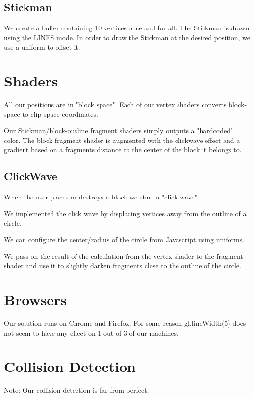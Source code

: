 \documentclass[12pt,leqno]{article}
\begin{document}
\subsection{Stickman}
We create a buffer containing 10 vertices once and for all.
The Stickman is drawn using the LINES mode.
In order to draw the Stickman at the desired position, we use a uniform to offset it.

\section{Shaders}
All our positions are in "block space". Each of our vertex shaders converts block-space to clip-space coordinates.

Our Stickman/block-outline fragment shaders simply outputs a "hardcoded" color. The block fragment shader is augmented with the clickwave effect and a gradient based on a fragments distance to the center of the block it belongs to.

\subsection{ClickWave}
When the user places or destroys a block we start a "click wave". 

We implemented the click wave by displacing vertices away from the outline of a circle.

We can configure the center/radius of the circle from Javascript using uniforms.

We pass on the result of the calculation from the vertex shader to the fragment shader and use it to slightly darken fragments close to the outline of the circle.

\section{Browsers}

Our solution runs on Chrome and Firefox. For some reason gl.lineWidth(5) does not seem to have any effect on 1 out of 3 of our machines.

\section{Collision Detection}

Note: Our collision detection is far from perfect. 

\end{document}
